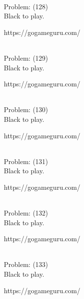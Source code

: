 \documentclass[11pt]{article}
\begin{document}
\begin{minipage}[t]{0.5\textwidth}
  {\centering
  
\\
Problem: (128)\\
Black to play.

https://gogameguru.com/\\
  }
\end{minipage}
\begin{minipage}[t]{0.5\textwidth}
  {\centering
  
\\
Problem: (129)\\
Black to play.

https://gogameguru.com/\\
  }
\end{minipage}
\begin{minipage}[t]{0.5\textwidth}
  {\centering
  
\\
Problem: (130)\\
Black to play.

https://gogameguru.com/\\
  }
\end{minipage}
\begin{minipage}[t]{0.5\textwidth}
  {\centering
  
\\
Problem: (131)\\
Black to play.

https://gogameguru.com/\\
  }
\end{minipage}
\begin{minipage}[t]{0.5\textwidth}
  {\centering
  
\\
Problem: (132)\\
Black to play.

https://gogameguru.com/\\
  }
\end{minipage}
\begin{minipage}[t]{0.5\textwidth}
  {\centering
  
\\
Problem: (133)\\
Black to play.

https://gogameguru.com/\\
  }
\end{minipage}
\end{document}
